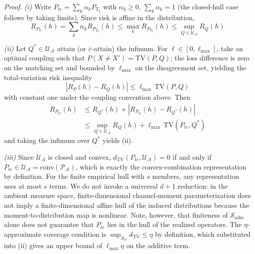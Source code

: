 \documentclass[electronics,article,submit,moreauthors]{Definitions/mdpi}
\begin{document}
\noindent\textit{Proof.}
\emph{(i)} Write $P_{te}=\sum_k\alpha_k P_{T_k}$ with $\alpha_k\geq0$, $\sum_k\alpha_k=1$ (the closed-hull case follows by taking limits). Since risk is affine in the distribution,
\begin{equation}
R_{P_{te}}(h)=\sum_k\alpha_k R_{P_{T_k}}(h)\leq\max_k R_{P_{T_k}}(h)\leq\sup_{Q\in\mathcal{U}_{\mathcal{A}}}R_Q(h)
\end{equation}

\emph{(ii)} Let $Q^*\in\mathcal{U}_{\mathcal{A}}$ attain (or $\varepsilon$-attain) the infimum. For $\ell\in[0,\ell_{\max}]$, take an optimal coupling such that $P(X\neq X')=\mathrm{TV}(P,Q)$; the loss difference is zero on the matching set and bounded by $\ell_{\max}$ on the disagreement set, yielding the total-variation risk inequality
\begin{equation}
|R_P(h)-R_Q(h)|\leq\ell_{\max}\,\mathrm{TV}(P,Q)
\end{equation}
with constant one under the coupling convention above. Then
\begin{equation*}
\begin{aligned}
R_{P_{te}}(h)&\leq R_{Q^*}(h)+|R_{P_{te}}(h)-R_{Q^*}(h)|\\
&\leq\sup_{Q\in\mathcal{U}_{\mathcal{A}}}R_Q(h)+\ell_{\max}\,\mathrm{TV}(P_{te},Q^*)
\end{aligned}
\end{equation*}
and taking the infimum over $Q^*$ yields (ii).

\emph{(iii)} Since $\mathcal{U}_{\mathcal{A}}$ is closed and convex, $d_{\mathrm{TV}}(P_{te},\mathcal{U}_{\mathcal{A}})=0$ if and only if $P_{te}\in\mathcal{U}_{\mathcal{A}}=\overline{\mathrm{conv}}(\mathcal{P}_{\mathcal{A}})$, which is exactly the convex-combination representation by definition. For the finite empirical hull with $s$ members, any representation uses at most $s$ terms. We do not invoke a universal $d+1$ reduction: in the ambient measure space, finite-dimensional channel-moment parameterization does not imply a finite-dimensional affine hull of the induced distributions because the moment-to-distribution map is nonlinear. Note, however, that finiteness of $\mathcal{S}_{\mathrm{adm}}$ alone does not guarantee that $P_{te}$ lies in the hull of the realized operators. The $\eta$-approximate coverage condition is $\sup_{S_{te}}d_{\mathrm{TV}}\leq\eta$ by definition, which substituted into (ii) gives an upper bound of $\ell_{\max}\eta$ on the additive term.
\end{document}
